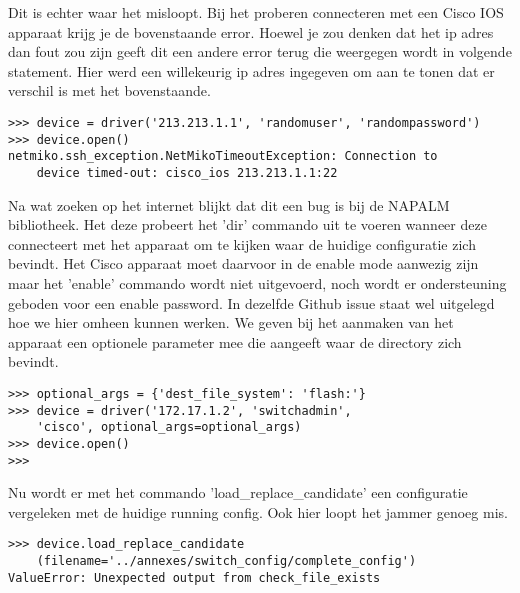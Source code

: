 Dit is echter waar het misloopt. Bij het proberen connecteren met een Cisco IOS apparaat krijg je de bovenstaande error.
Hoewel je zou denken dat het ip adres dan fout zou zijn geeft dit een andere error terug die weergegen wordt in volgende statement. Hier werd een willekeurig ip adres ingegeven om aan te tonen dat er verschil is met het bovenstaande.

\begin{center}
\begin{BVerbatim}
>>> device = driver('213.213.1.1', 'randomuser', 'randompassword')
>>> device.open()
netmiko.ssh_exception.NetMikoTimeoutException: Connection to 
    device timed-out: cisco_ios 213.213.1.1:22
\end{BVerbatim}
\end{center}

Na wat zoeken op het internet blijkt dat dit een bug is bij de NAPALM bibliotheek. Het deze probeert het 'dir' commando uit te voeren wanneer deze connecteert met het apparaat om te kijken waar de huidige configuratie zich bevindt. Het Cisco apparaat moet daarvoor in de enable mode aanwezig zijn maar het 'enable' commando wordt niet uitgevoerd, noch wordt er ondersteuning geboden voor een enable password. In dezelfde Github issue staat wel uitgelegd hoe we hier omheen kunnen werken. We geven bij het aanmaken van het apparaat een optionele parameter mee die aangeeft waar de directory zich bevindt.



\begin{center}
\begin{BVerbatim}
>>> optional_args = {'dest_file_system': 'flash:'}
>>> device = driver('172.17.1.2', 'switchadmin', 
    'cisco', optional_args=optional_args)
>>> device.open()
>>>
\end{BVerbatim}
\end{center}

Nu wordt er met het commando 'load\_replace\_candidate' een configuratie vergeleken met de huidige running config.
Ook hier loopt het jammer genoeg mis. 

\begin{center}
\begin{BVerbatim}
>>> device.load_replace_candidate
    (filename='../annexes/switch_config/complete_config')
ValueError: Unexpected output from check_file_exists
\end{BVerbatim}
\end{center}

